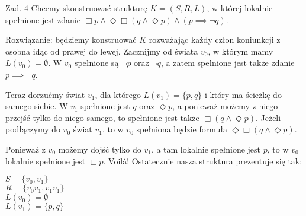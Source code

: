 \documentclass[11pt]{article}
\begin{document}
	\par Zad. 4 Chcemy skonstruować strukturę $K = (S, R, L)$, w której lokalnie spełnione jest zdanie $\Box p \land \Diamond\Box (q \land \Diamond p) \land (p \implies \neg q)$.
	\par Rozwiązanie: będziemy konstruować $K$ rozważając każdy człon koniunkcji z osobna idąc od prawej do lewej. Zacznijmy od świata $v_0$, w którym mamy $L(v_0) = \emptyset$. W $v_0$ spełnione są $\neg p$ oraz $\neg q$, a zatem spełnione jest także zdanie $p \implies \neg q$.
	\par Teraz dorzućmy świat $v_1$, dla którego $L(v_1) = \{p, q\}$ i który ma ścieżkę do samego siebie. W $v_1$ spełnione jest $q$ oraz $\Diamond p$, a ponieważ możemy z niego przejść tylko do niego samego, to spełnione jest także $\Box (q \land \Diamond p)$. Jeżeli podłączymy do $v_0$ świat $v_1$, to w $v_0$ spełniona będzie formuła $\Diamond\Box (q \land \Diamond p)$.
	\par Ponieważ z $v_0$ możemy dojść tylko do $v_1$, a tam lokalnie spełnione jest $p$, to w $v_0$ lokalnie spełnione jest $\Box p$. Voilà! Ostatecznie nasza struktura prezentuje się tak:
	
	\begin{center}
		$S = \{v_0, v_1\}$ \\
		$R = \{v_0 v_1, v_1 v_1\}$ \\
		$L(v_0) = \emptyset$ \\
		$L(v_1) = \{p, q\}$
	\end{center}
	
	\begin{center}
	\end{center}
	
	\newpage
	\EnableBpAbbreviations
	
\end{document}

